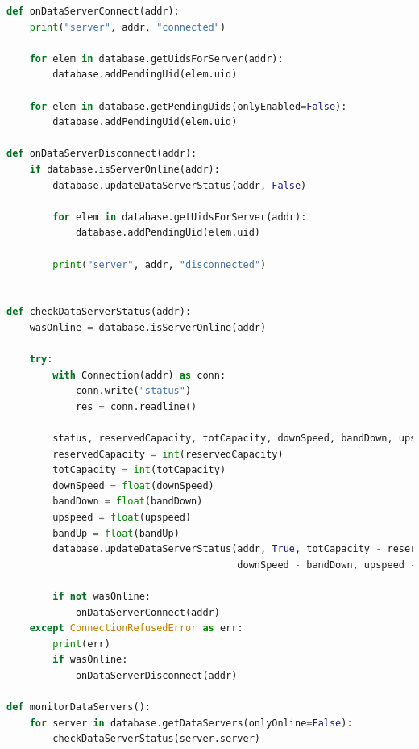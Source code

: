 \documentclass{article}
\begin{document}
\begin{lstlisting}[language=Python, title=Controllo dello stato dei dataserver]
def onDataServerConnect(addr):
    print("server", addr, "connected")

    for elem in database.getUidsForServer(addr):
        database.addPendingUid(elem.uid)

    for elem in database.getPendingUids(onlyEnabled=False):
        database.addPendingUid(elem.uid)

def onDataServerDisconnect(addr):
    if database.isServerOnline(addr):
        database.updateDataServerStatus(addr, False)

        for elem in database.getUidsForServer(addr):
            database.addPendingUid(elem.uid)

        print("server", addr, "disconnected")


def checkDataServerStatus(addr):
    wasOnline = database.isServerOnline(addr)
    
    try:
        with Connection(addr) as conn:
            conn.write("status")
            res = conn.readline()

        status, reservedCapacity, totCapacity, downSpeed, bandDown, upspeed, bandUp = res
        reservedCapacity = int(reservedCapacity)
        totCapacity = int(totCapacity)
        downSpeed = float(downSpeed)
        bandDown = float(bandDown)
        upspeed = float(upspeed)
        bandUp = float(bandUp)
        database.updateDataServerStatus(addr, True, totCapacity - reservedCapacity, totCapacity,
                                        downSpeed - bandDown, upspeed - bandUp)

        if not wasOnline:
            onDataServerConnect(addr)
    except ConnectionRefusedError as err:
        print(err)
        if wasOnline:
            onDataServerDisconnect(addr)

def monitorDataServers():
    for server in database.getDataServers(onlyOnline=False):
        checkDataServerStatus(server.server)
\end{lstlisting}
\end{document}
